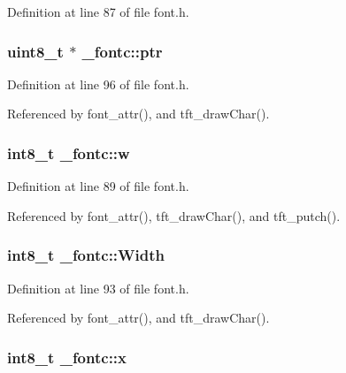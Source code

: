 Definition at line 87 of file font.\-h.

\hypertarget{struct__fontc_a60a3fef5ccd80dff543aac3f22f74876}{
\subsubsection[{ptr}]{\setlength{\rightskip}{0pt plus 5cm}uint8\-\_\-t $\ast$ \-\_\-fontc\-::ptr}}\label{struct__fontc_a60a3fef5ccd80dff543aac3f22f74876}


Definition at line 96 of file font.\-h.



Referenced by font\-\_\-attr(), and tft\-\_\-draw\-Char().

\hypertarget{struct__fontc_a9c2af0354d2b2009e7b6684e25fd479b}{
\subsubsection[{w}]{\setlength{\rightskip}{0pt plus 5cm}int8\-\_\-t \-\_\-fontc\-::w}}\label{struct__fontc_a9c2af0354d2b2009e7b6684e25fd479b}


Definition at line 89 of file font.\-h.



Referenced by font\-\_\-attr(), tft\-\_\-draw\-Char(), and tft\-\_\-putch().

\hypertarget{struct__fontc_ae3c802e1c35ae9a4e37c8eb2e9644325}{
\subsubsection[{Width}]{\setlength{\rightskip}{0pt plus 5cm}int8\-\_\-t \-\_\-fontc\-::\-Width}}\label{struct__fontc_ae3c802e1c35ae9a4e37c8eb2e9644325}


Definition at line 93 of file font.\-h.



Referenced by font\-\_\-attr(), and tft\-\_\-draw\-Char().

\hypertarget{struct__fontc_ad15d00ed46ebe52a085cf05b5ca5da90}{
\subsubsection[{x}]{\setlength{\rightskip}{0pt plus 5cm}int8\-\_\-t \-\_\-fontc\-::x}}\label{struct__fontc_ad15d00ed46ebe52a085cf05b5ca5da90}


